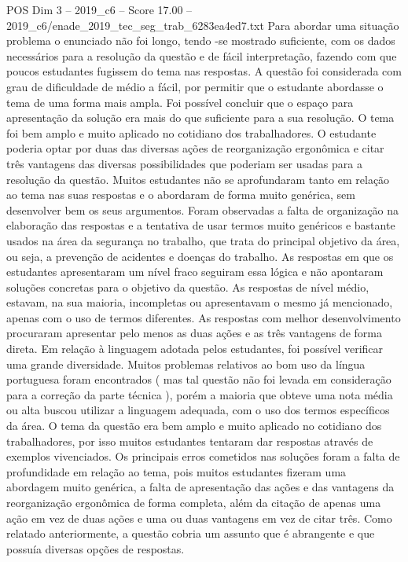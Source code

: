 \begin{textsample}{POS Dim 3 – 2019\_c6 – Score 17.00 – 2019\_c6/enade\_2019\_tec\_seg\_trab\_6283ea4ed7.txt}
Para abordar uma situação problema o enunciado não foi longo, tendo -se mostrado suficiente, com os dados necessários para a resolução da questão e de fácil interpretação, fazendo com que poucos estudantes fugissem do tema nas respostas.
A questão foi considerada com grau de dificuldade de médio a fácil, por permitir que o estudante abordasse o tema de uma forma mais ampla.
Foi possível concluir que o espaço para apresentação da solução era mais do que suficiente para a sua resolução.
O tema foi bem amplo e muito aplicado no cotidiano dos trabalhadores.
O estudante poderia optar por duas das diversas ações de reorganização ergonômica e citar três vantagens das diversas possibilidades que poderiam ser usadas para a resolução da questão.
Muitos estudantes não se aprofundaram tanto em relação ao tema nas suas respostas e o abordaram de forma muito genérica, sem desenvolver bem os seus argumentos.
Foram observadas a falta de organização na elaboração das respostas e a tentativa de usar termos muito genéricos e bastante usados na área da segurança no trabalho, que trata do principal objetivo da área, ou seja, a prevenção de acidentes e doenças do trabalho.
As respostas em que os estudantes apresentaram um nível fraco seguiram essa lógica e não apontaram soluções concretas para o objetivo da questão.
As respostas de nível médio, estavam, na sua maioria, incompletas ou apresentavam o mesmo já mencionado, apenas com o uso de termos diferentes.
As respostas com melhor desenvolvimento procuraram apresentar pelo menos as duas ações e as três vantagens de forma direta.
Em relação à linguagem adotada pelos estudantes, foi possível verificar uma grande diversidade.
Muitos problemas relativos ao bom uso da língua portuguesa foram encontrados ( mas tal questão não foi levada em consideração para a correção da parte técnica ), porém a maioria que obteve uma nota média ou alta buscou utilizar a linguagem adequada, com o uso dos termos específicos da área.
O tema da questão era bem amplo e muito aplicado no cotidiano dos trabalhadores, por isso muitos estudantes tentaram dar respostas através de exemplos vivenciados.
Os principais erros cometidos nas soluções foram a falta de profundidade em relação ao tema, pois muitos estudantes fizeram uma abordagem muito genérica, a falta de apresentação das ações e das vantagens da reorganização ergonômica de forma completa, além da citação de apenas uma ação em vez de duas ações e uma ou duas vantagens em vez de citar três.
Como relatado anteriormente, a questão cobria um assunto que é abrangente e que possuía diversas opções de respostas.

\end{textsample}
